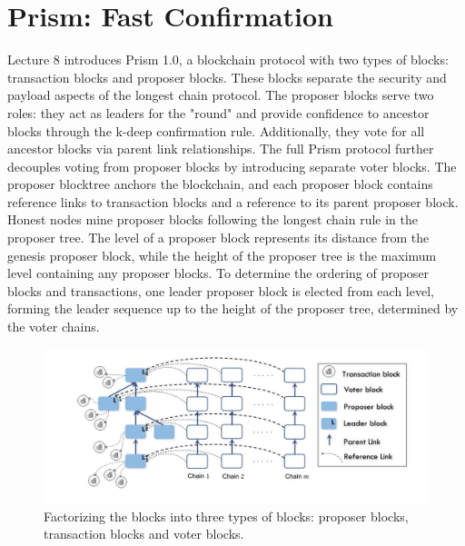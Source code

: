 \documentclass{report}
\begin{document}
\section{Prism: Fast Confirmation}
Lecture 8 introduces Prism 1.0, a blockchain protocol with two types of blocks: transaction blocks and proposer blocks. These blocks separate the security and payload aspects of the longest chain protocol. The proposer blocks serve two roles: they act as leaders for the "round" and provide confidence to ancestor blocks through the k-deep confirmation rule. Additionally, they vote for all ancestor blocks via parent link relationships. The full Prism protocol further decouples voting from proposer blocks by introducing separate voter blocks. The proposer blocktree anchors the blockchain, and each proposer block contains reference links to transaction blocks and a reference to its parent proposer block. Honest nodes mine proposer blocks following the longest chain rule in the proposer tree. The level of a proposer block represents its distance from the genesis proposer block, while the height of the proposer tree is the maximum level containing any proposer blocks. To determine the ordering of proposer blocks and transactions, one leader proposer block is elected from each level, forming the leader sequence up to the height of the proposer tree, determined by the voter chains.
\begin{center}
	\begin{figure}
		\centering
		\includegraphics[width=0.8\linewidth]{Fig/F3}
		\caption{Factorizing the blocks into three types of blocks: proposer blocks, transaction blocks and voter blocks.}
		\label{fig:f3}
	\end{figure}
\end{center}
\end{document}
